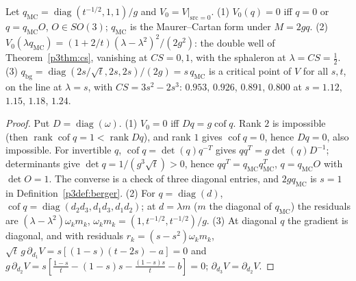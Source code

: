 \begin{theorem}\label{p3thm:vacua}
 Let $q_{\mathrm{MC}}=\operatorname{diag}(t^{-1/2},1,1)/g$ and $V_0=V|_{\mathrm{src}=0}$.
(1) $V_0(q)=0$ iff $q=0$ or $q=q_{\mathrm{MC}}O$, $O\in SO(3)$; $q_{\mathrm{MC}}$ is the Maurer--Cartan form under $M=2gq$.
(2) $V_0(\lambda q_{\mathrm{MC}})=(1+2/t)(\lambda-\lambda^2)^2/(2g^2)$: the double well of Theorem~\ref{p3thm:cs}, vanishing at
$CS=0,1$, with the sphaleron at $\lambda=CS=\tfrac12$. (3) $q_{\mathrm{bg}}=\operatorname{diag}(2s/\sqrt t,2s,2s)/(2g)=s\,q_{\mathrm{MC}}$
is a critical point of $V$ for all $s,t$, on the line at $\lambda=s$, with $CS=3s^2-2s^3$: $0.953$, $0.926$, $0.891$,
$0.800$ at $s=1.12$, $1.15$, $1.18$, $1.24$.
\end{theorem}
\begin{proof}
Put $D=\operatorname{diag}(\omega)$. (1) $V_0=0$ iff $Dq=g\operatorname{cof}q$. Rank $2$ is impossible (then
$\operatorname{rank}\operatorname{cof}q=1<\operatorname{rank}Dq$), and rank $1$ gives $\operatorname{cof}q=0$, hence $Dq=0$, also impossible. For invertible $q$,
$\operatorname{cof}q=\det(q)q^{-T}$ gives $qq^T=g\det(q)D^{-1}$; determinants give $\det q=1/(g^3\sqrt t)>0$, hence
$qq^T=q_{\mathrm{MC}}q_{\mathrm{MC}}^T$, $q=q_{\mathrm{MC}}O$ with $\det O=1$. The converse is a check of three diagonal entries,
and $2gq_{\mathrm{MC}}$ is $s=1$ in Definition~\ref{p3def:berger}. (2) For $q=\operatorname{diag}(d)$,
$\operatorname{cof}q=\operatorname{diag}(d_2d_3,d_1d_3,d_1d_2)$; at $d=\lambda m$ ($m$ the diagonal of $q_{\mathrm{MC}}$) the residuals are
$(\lambda-\lambda^2)\omega_km_k$, $\omega_km_k=(1,t^{-1/2},t^{-1/2})/g$. (3) At diagonal $q$ the gradient is diagonal, and
with residuals $r_k=(s-s^2)\omega_km_k$,
$\sqrt t\,g\,\partial_{d_1}V=s[(1-s)(t-2s)-a]=0$ and
$g\,\partial_{d_2}V=s[\tfrac{1-s}t-(1-s)s-\tfrac{(1-s)s}t-b]=0$; $\partial_{d_3}V=\partial_{d_2}V$.
\end{proof}

